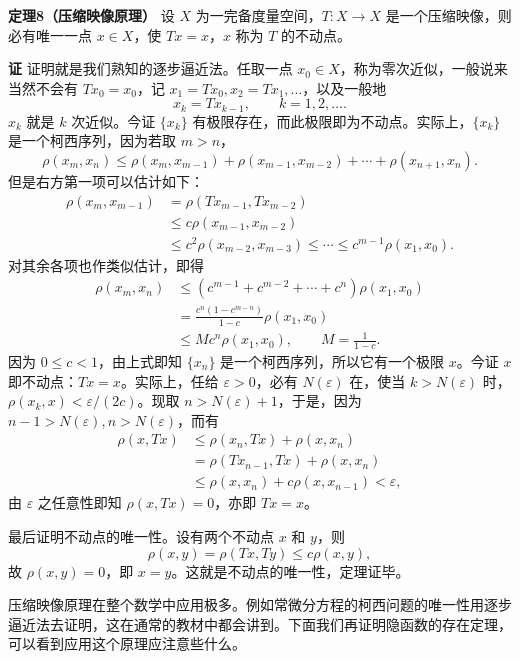 \noindent\textbf{定理8（压缩映像原理）}\quad
设 $X$ 为一完备度量空间，$T:X\to X$ 是一个压缩映像，则必有唯一一点 $x\in X$，使 $Tx=x$，$x$ 称为 $T$ 的不动点。

\noindent\textbf{证}\quad
证明就是我们熟知的逐步逼近法。任取一点 $x_0\in X$，称为零次近似，一般说来当然不会有 $Tx_0=x_0$，记 $x_1=Tx_0,x_2=Tx_1,\ldots$，以及一般地
\begin{equation}
 x_k=Tx_{k-1},\qquad k=1,2,\ldots.
 \tag{14}
\end{equation}
$x_k$ 就是 $k$ 次近似。今证 $\{x_k\}$ 有极限存在，而此极限即为不动点。实际上，$\{x_k\}$ 是一个柯西序列，因为若取 $m>n$，
\[
 \rho(x_m,x_n)\le \rho(x_m,x_{m-1})+\rho(x_{m-1},x_{m-2})+\cdots+\rho(x_{n+1},x_n).
\]
但是右方第一项可以估计如下：
\[
\begin{aligned}
 \rho(x_m,x_{m-1})
 &=\rho(Tx_{m-1},Tx_{m-2})\\
 &\le c\rho(x_{m-1},x_{m-2})\\
 &\le c^2\rho(x_{m-2},x_{m-3})\le\cdots\le c^{m-1}\rho(x_1,x_0).
\end{aligned}
\]
对其余各项也作类似估计，即得
\[
\begin{aligned}
 \rho(x_m,x_n)
 &\le(c^{m-1}+c^{m-2}+\cdots+c^n)\rho(x_1,x_0)\\
 &=\frac{c^n(1-c^{m-n})}{1-c}\rho(x_1,x_0)\\
 &\le Mc^n\rho(x_1,x_0),\qquad M=\frac1{1-c}.
\end{aligned}
\]
因为 $0\le c<1$，由上式即知 $\{x_n\}$ 是一个柯西序列，所以它有一个极限 $x$。今证 $x$ 即不动点：$Tx=x$。实际上，任给 $\varepsilon>0$，必有 $N(\varepsilon)$ 在，使当 $k>N(\varepsilon)$ 时，$\rho(x_k,x)<\varepsilon/(2c)$。现取 $n>N(\varepsilon)+1$，于是，因为 $n-1>N(\varepsilon),n>N(\varepsilon)$，而有
\[
\begin{aligned}
 \rho(x,Tx)
 &\le\rho(x_n,Tx)+\rho(x,x_n)\\
 &=\rho(Tx_{n-1},Tx)+\rho(x,x_n)\\
 &\le\rho(x,x_n)+c\rho(x,x_{n-1})<\varepsilon,
\end{aligned}
\]
由 $\varepsilon$ 之任意性即知 $\rho(x,Tx)=0$，亦即 $Tx=x$。

最后证明不动点的唯一性。设有两个不动点 $x$ 和 $y$，则
\[
 \rho(x,y)=\rho(Tx,Ty)\le c\rho(x,y),
\]
故 $\rho(x,y)=0$，即 $x=y$。这就是不动点的唯一性，定理证毕。

压缩映像原理在整个数学中应用极多。例如常微分方程的柯西问题的唯一性用逐步逼近法去证明，这在通常的教材中都会讲到。下面我们再证明隐函数的存在定理，可以看到应用这个原理应注意些什么。

